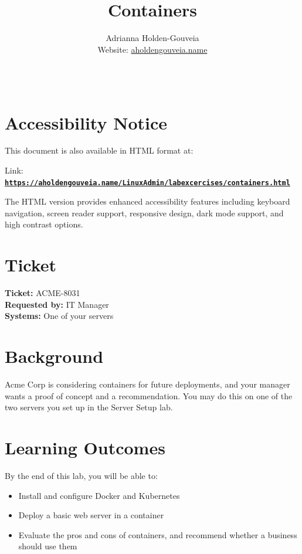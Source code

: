 \documentclass[12pt]{article}
\title{Containers}
\author{
        Adrianna Holden-Gouveia \\
        Website: \href{https://aholdengouveia.name}{aholdengouveia.name}\\ 
        \date{\vspace{-5ex}}
        \faGithub {: aholdengouveia} \\
        }
\begin{document}
    

\maketitle



\section*{Accessibility Notice}
This document is also available in HTML format at:

Link: \href{https://aholdengouveia.name/LinuxAdmin/labexcercises/containers.html}{\textbf{\nolinkurl{https://aholdengouveia.name/LinuxAdmin/labexcercises/containers.html}}}

The HTML version provides enhanced accessibility features including keyboard navigation, screen reader support, responsive design, dark mode support, and high contrast options.


\section*{Ticket}
\noindent\textbf{Ticket:} ACME-8031\\
\textbf{Requested by:} IT Manager\\
\textbf{Systems:} One of your servers

\section*{Background}
Acme Corp is considering containers for future deployments, and your manager wants a proof of concept and a recommendation. You may do this on one of the two servers you set up in the Server Setup lab.

\section*{Learning Outcomes}
By the end of this lab, you will be able to:
\begin{itemize}
    \item Install and configure Docker and Kubernetes
    \item Deploy a basic web server in a container
    \item Evaluate the pros and cons of containers, and recommend whether a business should use them
\end{itemize}
\end{document}
